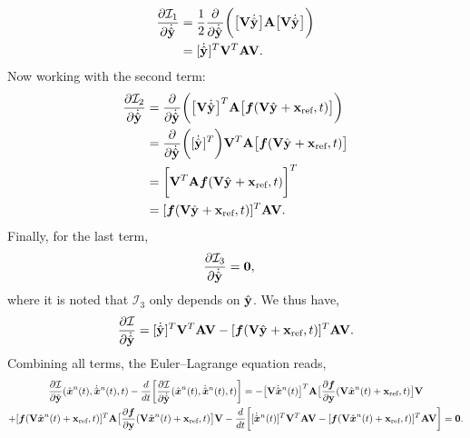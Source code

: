\documentclass[3p,computermodern,10pt]{elsarticle}
\begin{document}
\begin{appendices}
\begin{align*}
\frac{\partial \minintegrand_1}{\partial \genstateyDiscreteDotArgnt{}} &=
\frac{1}{2} \frac{\partial}{\partial \genstateyDiscreteDotArgnt{} }\bigg( \big[ \basisspace \genstateyDiscreteDotArgnt{} \big]  \stweightingMatArg{n}  \big[ \basisspace \genstateyDiscreteDotArgnt{} \big]  \bigg) \\
&= [\genstateyDiscreteDotArgnt{}]^T \basisspace^T \stweightingMatArg{n} \basisspace.
\end{align*}
Now working with the second term:
\begin{align*}
\frac{\partial \minintegrand_2}{\partial \genstateyDiscreteDotArgnt{} } &=
\frac{\partial}{\partial \genstateyDiscreteDotArgnt{}  } \bigg( \big[ \basisspace \genstateyDiscreteDotArgnt{} \big]^T \stweightingMatArg{n} \big[ \velocity(\veloargsromy) \big]  \bigg)\\
 &= \frac{\partial}{\partial \genstateyDiscreteDotArgnt{} } \bigg( [\genstateyDiscreteDotArgnt{}]^T \bigg) \basisspace^T  \stweightingMatArg{n} \big[ \velocity(\veloargsromy) \big] \\ 
 &= \bigg[  \basisspace^T  \stweightingMatArg{n}  \velocity(\veloargsromy )   \bigg]^T \\
 &= [\velocity(\veloargsromy) ]^T \stweightingMatArg{n} \basisspace.
\end{align*}
Finally, for the last term,
\begin{align*}
\frac{\partial \minintegrand_3}{\partial \genstateyDiscreteDotArgnt{} } &= \boldsymbol 0,
\end{align*}
where it is noted that $\mathcal{I}_3$ only depends on $\genstateyDiscrete$. We thus have,
$$\frac{\partial \minintegrand}{\partial \dot{ \genstateyDiscrete} } =   [\genstateyDiscreteDotArgnt{}]^T \basisspace^T \stweightingMatArg{n} \basisspace -  [\velocity(\veloargsromy ) ]^T \stweightingMatArg{n} \basisspace.$$
Combining all terms, the Euler--Lagrange equation reads,
\begin{multline*}
 \frac{\partial \minintegrand}{\partial \genstateyDiscrete}(\genstateArg{n}{t},\genstateDotArg{n}{t},t)  - \frac{d}{dt} \bigg[ \frac{\partial \minintegrand}{\partial \genstateyDiscreteDotArgnt{}} (\genstateArg{n}{t},\genstateDotArg{n}{t},t) \bigg] =  - \big[ \basisspace \genstateDotArg{n}{t}  \big]^T \stweightingMatArg{n} \big[  \frac{\partial \velocity}{\partial \stateyDiscrete} (\veloargsromn) \big] \basisspace \\ + [\velocity(\veloargsromn) ]^T \stweightingMatArg{n} \big[ \frac{\partial \velocity}{\partial \stateyDiscrete} (\veloargsromn) \big] \basisspace - \frac{d}{dt} \bigg[  [\genstateDotArg{n}{t} ]^T  \basisspace^T \stweightingMatArg{n} \basisspace - [\velocity(\veloargsromn) ]^T \stweightingMatArg{n} \basisspace \bigg]  = \boldsymbol 0.

\end{multline*}
\end{appendices}
\end{document}
